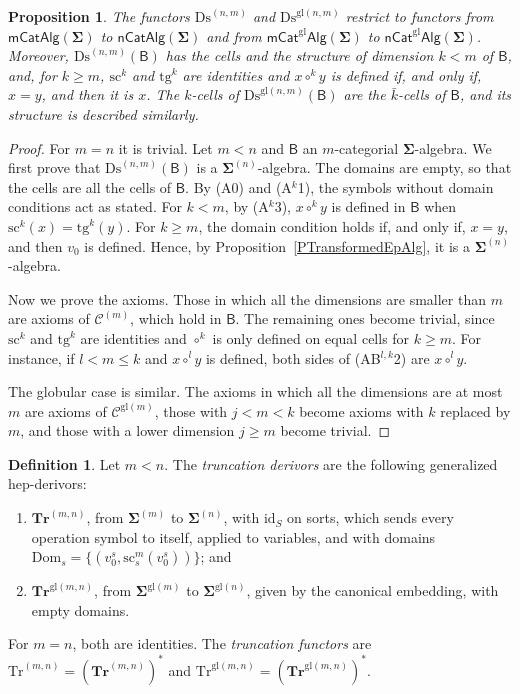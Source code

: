 \documentclass[a4paper,reqno]{amsart}
\newcommand{\sig}[1]{\mathbf{#1}}                %
\newcommand{\calg}[1]{\boldsymbol{\mathsf{#1}}}  %
\newcommand{\Dom}{\mathrm{Dom}}
\newcommand{\id}{\mathrm{id}}
\newcommand{\gl}{\mathrm{gl}}
\newcommand{\src}{\mathrm{sc}}
\newcommand{\tgt}{\mathrm{tg}}
\newcommand{\Ds}{\mathrm{Ds}}
\newcommand{\Tr}{\mathrm{Tr}}
\newcommand{\bTr}{\mathbf{Tr}}
\theoremstyle{plain}
\newtheorem{proposition}[theorem]{Proposition}
\theoremstyle{definition}
\newtheorem{definition}[theorem]{Definition}
\begin{document}
\begin{proposition}\label{PDiscDerivor}
The functors $\Ds^{(n,m)}$ and $\Ds^{\gl(n,m)}$ restrict to functors from $\mathsf{mCatAlg}(\sig{\Sigma})$ to $\mathsf{nCatAlg}(\sig{\Sigma})$ and from $\mathsf{mCat}^{\gl}\mathsf{Alg}(\sig{\Sigma})$ to $\mathsf{nCat}^{\gl}\mathsf{Alg}(\sig{\Sigma})$.
Moreover, $\Ds^{(n,m)}(\calg{B})$ has the cells and the structure of dimension $k<m$ of $\calg{B}$, and, for $k\geq m$, $\src^{k}$ and $\tgt^{k}$ are identities and $x\circ^{k}y$ is defined if, and only if, $x=y$, and then it is $x$.
The $k$-cells of $\Ds^{\gl(n,m)}(\calg{B})$ are the $\bar{k}$-cells of $\calg{B}$, and its structure is described similarly.
\end{proposition}
\begin{proof}
For $m=n$ it is trivial.
Let $m<n$ and $\calg{B}$ an $m$-categorial $\sig{\Sigma}$-algebra.
We first prove that $\Ds^{(n,m)}(\calg{B})$ is a $\sig{\Sigma}^{(n)}$-algebra.
The domains are empty, so that the cells are all the cells of $\calg{B}$.
By (A0) and (A$^{k}$1), the symbols without domain conditions act as stated.
For $k<m$, by (A$^{k}$3), $x\circ^{k}y$ is defined in $\calg{B}$ when $\src^{k}(x)=\tgt^{k}(y)$.
For $k\geq m$, the domain condition holds if, and only if, $x=y$, and then $v_{0}$ is defined.
Hence, by Proposition~\ref{PTransformedEpAlg}, it is a $\sig{\Sigma}^{(n)}$-algebra.

Now we prove the axioms.
Those in which all the dimensions are smaller than $m$ are axioms of $\mathcal{C}^{(m)}$, which hold in $\calg{B}$.
The remaining ones become trivial, since $\src^{k}$ and $\tgt^{k}$ are identities and $\circ^{k}$ is only defined on equal cells for $k\geq m$.
For instance, if $l<m\leq k$ and $x\circ^{l}y$ is defined, both sides of (AB$^{l,k}$2) are $x\circ^{l}y$.

The globular case is similar.
The axioms in which all the dimensions are at most $m$ are axioms of $\mathcal{C}^{\gl(m)}$, those with $j<m<k$ become axioms with $k$ replaced by $m$, and those with a lower dimension $j\geq m$ become trivial.
\end{proof}

\begin{definition}\label{DTruncDerivor}
Let $m<n$.
The \emph{truncation derivors} are the following generalized hep-derivors:
\begin{enumerate}
\item $\bTr^{(m,n)}$, from $\sig{\Sigma}^{(m)}$ to $\sig{\Sigma}^{(n)}$, with $\id_{S}$ on sorts, which sends every operation symbol to itself, applied to variables, and with domains $\Dom_{s}=\{(v^{s}_{0},\src^{m}_{s}(v^{s}_{0}))\}$; and
\item $\bTr^{\gl(m,n)}$, from $\sig{\Sigma}^{\gl(m)}$ to $\sig{\Sigma}^{\gl(n)}$, given by the canonical embedding, with empty domains.
\end{enumerate}
For $m=n$, both are identities.
The \emph{truncation functors} are $\Tr^{(m,n)}=(\bTr^{(m,n)})^{\ast}$ and $\Tr^{\gl(m,n)}=(\bTr^{\gl(m,n)})^{\ast}$.
\end{definition}
\end{document}
